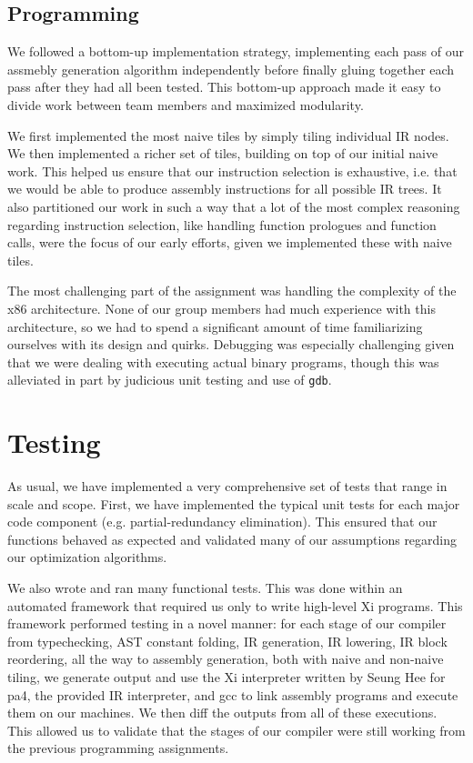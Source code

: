 \documentclass{hw}
\begin{document}
\subsection{Programming}
We followed a bottom-up implementation strategy, implementing each pass of our
assmebly generation algorithm independently before finally gluing together each
pass after they had all been tested. This bottom-up approach made it easy to
divide work between team members and maximized modularity.

We first implemented the most naive tiles by simply tiling individual IR nodes.
We then implemented a richer set of tiles, building on top of our initial naive
work. This helped us ensure that our instruction selection is exhaustive, i.e.
that we would be able to produce assembly instructions for all possible IR trees.
It also partitioned our work in such a way that a lot of the most complex reasoning
regarding instruction selection, like handling function prologues and function calls,
were the focus of our early efforts, given we implemented these with naive tiles. 

The most challenging part of the assignment was handling the complexity of the x86
architecture. None of our group members had much experience with this architecture,
so we had to spend a significant amount of time familiarizing ourselves with
its design and quirks. Debugging was especially challenging given that we were
dealing with executing actual binary programs, though this was alleviated in part
by judicious unit testing and use of \texttt{gdb}.

\section{Testing}\label{sec:testing}
As usual, we have implemented a very comprehensive set of tests that range in
scale and scope. First, we have implemented the typical unit tests for each major
code component (e.g. partial-redundancy elimination). This ensured that our functions behaved as
expected and validated many of our assumptions regarding our optimization algorithms.

We also wrote and ran many functional tests. This was done within
an automated framework that required us only to write high-level Xi programs. This
framework performed testing in a novel manner: for each stage of our compiler from
typechecking, AST constant folding, IR generation, IR lowering, IR block reordering,
all the way to assembly generation, both with naive and non-naive tiling, we generate
output and use the Xi interpreter written by Seung Hee for pa4,
the provided IR interpreter, and gcc to link assembly programs and execute them on our
machines. We then diff the outputs from all of these executions. This allowed us to validate that the stages of our compiler were still working from the previous programming assignments.
\end{document}
